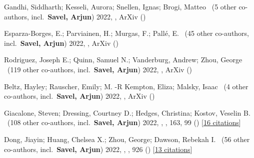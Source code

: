 \item[{\color{numcolor}\scriptsize21}] Gandhi, Siddharth; Kesseli, Aurora; Snellen, Ignas; Brogi, Matteo \etal\ ({5} other co-authors, incl.\ \textbf{Savel, Arjun}) 2022, , ArXiv ()

\item[{\color{numcolor}\scriptsize20}] Esparza-Borges, E.; Parviainen, H.; Murgas, F.; Pall{\'e}, E. \etal\ ({45} other co-authors, incl.\ \textbf{Savel, Arjun}) 2022, , ArXiv ()

\item[{\color{numcolor}\scriptsize19}] Rodriguez, Joseph E.; Quinn, Samuel N.; Vanderburg, Andrew; Zhou, George \etal\ ({119} other co-authors, incl.\ \textbf{Savel, Arjun}) 2022, , ArXiv ()

\item[{\color{numcolor}\scriptsize18}] Beltz, Hayley; Rauscher, Emily; M. -R Kempton, Eliza; Malsky, Isaac \etal\ ({4} other co-authors, incl.\ \textbf{Savel, Arjun}) 2022, , ArXiv ()

\item[{\color{numcolor}\scriptsize17}] Giacalone, Steven; Dressing, Courtney D.; Hedges, Christina; Kostov, Veselin B. \etal\ ({108} other co-authors, incl.\ \textbf{Savel, Arjun}) 2022, , \aj, {163}, 99 () [\href{https://ui.adsabs.harvard.edu/abs/2022AJ....163...99G}{16 citations}]

\item[{\color{numcolor}\scriptsize16}] Dong, Jiayin; Huang, Chelsea X.; Zhou, George; Dawson, Rebekah I. \etal\ ({56} other co-authors, incl.\ \textbf{Savel, Arjun}) 2022, , \apj, {926} () [\href{https://ui.adsabs.harvard.edu/abs/2022ApJ...926L...7D}{13 citations}]

